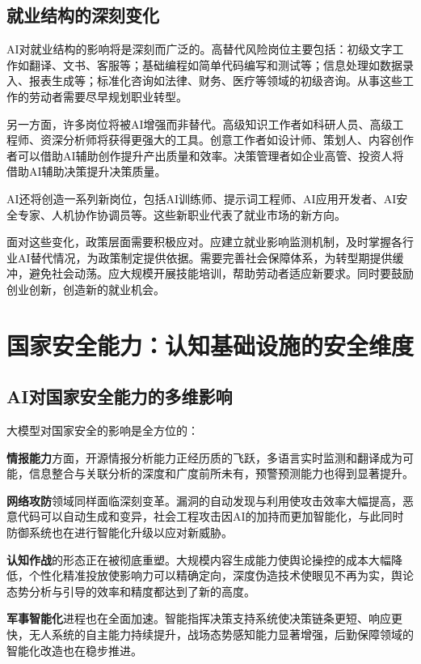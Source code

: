 \subsection{就业结构的深刻变化}

AI对就业结构的影响将是深刻而广泛的。高替代风险岗位主要包括：初级文字工作如翻译、文书、客服等；基础编程如简单代码编写和测试等；信息处理如数据录入、报表生成等；标准化咨询如法律、财务、医疗等领域的初级咨询。从事这些工作的劳动者需要尽早规划职业转型。

另一方面，许多岗位将被AI增强而非替代。高级知识工作者如科研人员、高级工程师、资深分析师将获得更强大的工具。创意工作者如设计师、策划人、内容创作者可以借助AI辅助创作提升产出质量和效率。决策管理者如企业高管、投资人将借助AI辅助决策提升决策质量。

AI还将创造一系列新岗位，包括AI训练师、提示词工程师、AI应用开发者、AI安全专家、人机协作协调员等。这些新职业代表了就业市场的新方向。

面对这些变化，政策层面需要积极应对。应建立就业影响监测机制，及时掌握各行业AI替代情况，为政策制定提供依据。需要完善社会保障体系，为转型期提供缓冲，避免社会动荡。应大规模开展技能培训，帮助劳动者适应新要求。同时要鼓励创业创新，创造新的就业机会。

\section{国家安全能力：认知基础设施的安全维度}

\subsection{AI对国家安全能力的多维影响}

大模型对国家安全的影响是全方位的：

\textbf{情报能力}方面，开源情报分析能力正经历质的飞跃，多语言实时监测和翻译成为可能，信息整合与关联分析的深度和广度前所未有，预警预测能力也得到显著提升。

\textbf{网络攻防}领域同样面临深刻变革。漏洞的自动发现与利用使攻击效率大幅提高，恶意代码可以自动生成和变异，社会工程攻击因AI的加持而更加智能化，与此同时防御系统也在进行智能化升级以应对新威胁。

\textbf{认知作战}的形态正在被彻底重塑。大规模内容生成能力使舆论操控的成本大幅降低，个性化精准投放使影响力可以精确定向，深度伪造技术使眼见不再为实，舆论态势分析与引导的效率和精度都达到了新的高度。

\textbf{军事智能化}进程也在全面加速。智能指挥决策支持系统使决策链条更短、响应更快，无人系统的自主能力持续提升，战场态势感知能力显著增强，后勤保障领域的智能化改造也在稳步推进。

